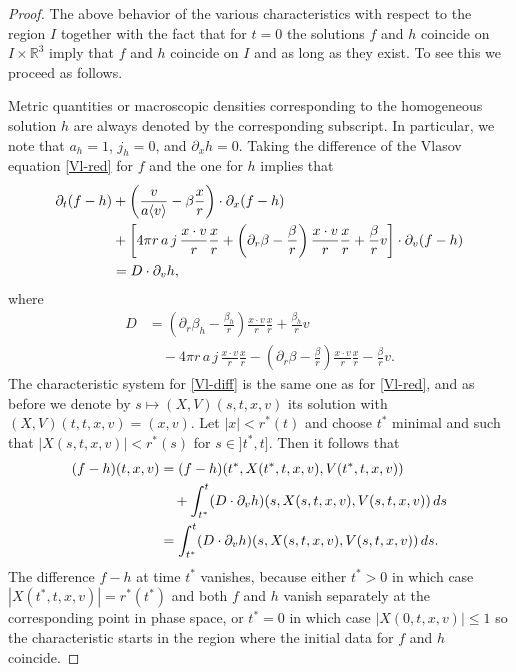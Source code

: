 \documentclass[11pt]{article}
\def\R{\mathbb R}
\def\p0{\langle v \rangle}
\begin{document}
\begin{proof}
  The above behavior of the various characteristics with respect to
  the region $I$ together with the fact that for $t=0$
  the solutions $f$ and $h$ coincide on $I\times \R^3$ imply
  that $f$ and $h$ coincide on $I$ and as long as they exist.
  To see this we proceed as follows.

  Metric quantities or macroscopic densities corresponding to the
  homogeneous solution $h$ are always denoted by the corresponding
  subscript. In particular, we note that $a_h=1$, $j_h=0$, and
  $\partial_x h=0$. Taking the difference of the Vlasov equation
  \eqref{Vl-red} for $f$ and the one for $h$ implies that
  \begin{align}\label{Vl-diff}
    \partial_t (f-h)
    &+
    \left(\frac{v}{a \p0}-\beta\frac{x}{r}\right)\cdot \partial_x (f-h)\notag \\
    & {}+ \left[4\pi r \,a\, j\, \frac{x\cdot v}{r} \frac{x}{r}
      +\left(\partial_r\beta-\frac{\beta}{r}\right)\frac{x\cdot v}{r}
      \frac{x}{r} +\frac{\beta}{r} v\right]
    \cdot\partial_v (f-h)\notag\\
    &=
    D \cdot\partial_v h ,
  \end{align}
  where
  \begin{align*}
    D &=\left(\partial_r\beta_h-\frac{\beta_h}{r}\right)\frac{x\cdot v}{r}
      \frac{x}{r}
      +\frac{\beta_h}{r} v \\
      &\quad{}- 4\pi r \,a\, j\, \frac{x\cdot v}{r} \frac{x}{r}
      -\left(\partial_r\beta-\frac{\beta}{r}\right)\frac{x\cdot v}{r}
      \frac{x}{r} - \frac{\beta}{r} v .
  \end{align*}
  The characteristic system for \eqref{Vl-diff} is the same one as for
  \eqref{Vl-red}, and as before we denote by $s\mapsto (X,V)(s,t,x,v)$
  its solution with  $(X,V)(t,t,x,v)=(x,v)$. Let $|x| < r^\ast(t)$
  and choose $t^\ast$ minimal and such that
  $|X(s,t,x,v)|< r^\ast(s)$ for $s\in ]t^\ast, t]$. Then it follows that
  \begin{align}\label{diff_fh}
    (f-h)(t,x,v)
    &=
    (f-h)(t^\ast,X(t^\ast,t,x,v),V(t^\ast,t,x,v))\notag \\
    &\quad {}+
    \int_{t^\ast}^t (D\cdot \partial_v h)(s,X(s,t,x,v),V(s,t,x,v))\, ds\notag \\
    &=
    \int_{t^\ast}^t (D\cdot \partial_v h)(s,X(s,t,x,v),V(s,t,x,v))\, ds.
  \end{align}
  The difference $f-h$ at time $t^\ast$ vanishes, because either
  $t^\ast>0$ in which case $|X(t^\ast,t,x,v)|=r^\ast(t^\ast)$
  and both $f$ and $h$ vanish separately at the corresponding
  point in phase space, or $t^\ast=0$ in which case
  $|X(0,t,x,v)|\leq 1$ so the characteristic starts in the
  region where the initial data for $f$ and $h$ coincide.


\end{proof}
\end{document}
